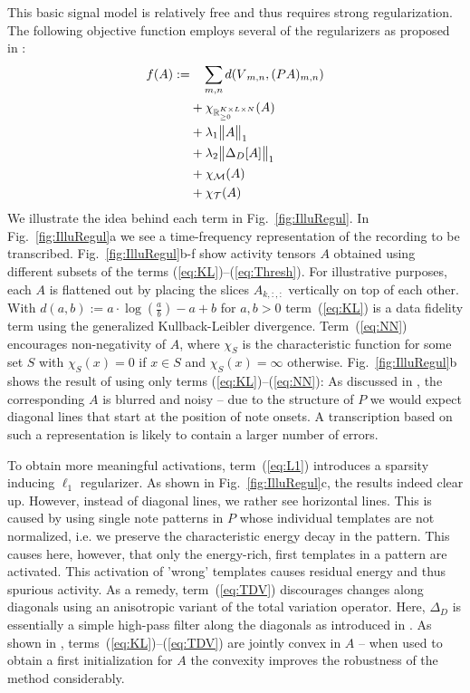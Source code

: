 \documentclass{article}
\def\R{{\mathbb R}}
\def\dict{{P}}
\def\act{{A}}
\def\spec{{V}}
\newcommand{\apspecvar}[1]{{\dict{#1}}}
\def\apspec{{\apspecvar{\act}}}
\def\distsmall{{d}}
\def\objf{{f}}
\def\charfunc{{\chi}}
\newcommand{\ind}[1]{{_{#1}}}
\DeclarePairedDelimiter{\normcore}{\lVert}{\rVert}
\newcommand{\norm}[1]{\normcore[\big]{#1}}
\def\markov{{\mathcal M}}
\def\threshset{{\mathcal T}}
\def\markov{{\mathcal M}}
\def\tdvop{{\Delta_D}}
\begin{document}
This basic signal model is relatively free and thus requires strong regularization. The following objective function employs several of the regularizers as proposed in \cite{EwertS16_PianoTranscriptionADMM_TASLP}:
\begin{align}
\objf(\act) := & \quad \sum_{m,n}\distsmall(\spec\ind{m,n},(\apspec)\ind{m,n}) \label{eq:KL}\\
& + \charfunc_{\R_{\ge 0}^{K\times L \times N}}(\act) \label{eq:NN}\\
& + \lambda_1 \norm{\act}_1 \label{eq:L1}\\
& + \lambda_2 \norm{\tdvop[\act]}_1 \label{eq:TDV}\\
& + \charfunc_\markov(\act) \label{eq:Markov}\\
& + \charfunc_\threshset(\act) \label{eq:Thresh}
\end{align}
We illustrate the idea behind each term in Fig.~\ref{fig:IlluRegul}. In Fig.~\ref{fig:IlluRegul}a we see a time-frequency representation of the recording to be transcribed. Fig.~\ref{fig:IlluRegul}b-f show activity tensors $\act$ obtained using different subsets of the terms (\ref{eq:KL})--(\ref{eq:Thresh}). For illustrative purposes, each $\act$ is flattened out by placing the slices $\act\ind{k,:,:}$ vertically on top of each other.
With $\distsmall(a,b) := a \cdot \log\left(\frac{a}{b}\right) - a + b$ for $a,b> 0$ term~(\ref{eq:KL}) is a data fidelity term using the generalized Kullback-Leibler divergence. Term~(\ref{eq:NN}) encourages non-negativity of $\act$, where $\charfunc_S$ is the characteristic function for some set $S$ with $\charfunc_S(x)=0$ if $x \in S$ and $\charfunc_S(x)=\infty$ otherwise. Fig.~\ref{fig:IlluRegul}b shows the result of using only terms (\ref{eq:KL})--(\ref{eq:NN}): As discussed in \cite{EwertS16_PianoTranscriptionADMM_TASLP}, the corresponding $\act$ is blurred and noisy -- due to the structure of $\dict$ we would expect diagonal lines that start at the position of note onsets. A transcription based on such a representation is likely to contain a larger number of errors.

To obtain more meaningful activations, term~(\ref{eq:L1}) introduces a sparsity inducing $\ell_1$ regularizer. As shown in Fig.~\ref{fig:IlluRegul}c, the results indeed clear up. However, instead of diagonal lines, we rather see horizontal lines. This is caused by using single note patterns in $\dict$ whose individual templates are not normalized, i.e. we preserve the characteristic energy decay in the pattern. This causes here, however, that only the energy-rich, first templates in a pattern are activated. This activation of 'wrong' templates causes residual energy and thus spurious activity. As a remedy, term~(\ref{eq:TDV}) discourages changes along diagonals using an anisotropic variant of the total variation operator. Here, $\tdvop$ is essentially a simple high-pass filter along the diagonals as introduced in \cite{EwertS16_PianoTranscriptionADMM_TASLP}. As shown in \cite{EwertS16_PianoTranscriptionADMM_TASLP}, terms~(\ref{eq:KL})--(\ref{eq:TDV}) are jointly convex in $\act$ -- when used to obtain a first initialization for $\act$ the convexity improves the robustness of the method considerably.
\end{document}
